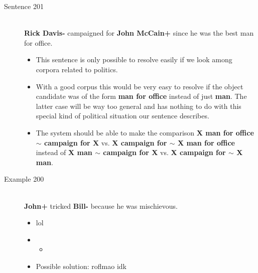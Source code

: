 \documentclass{article}
\newcommand{\insertcode}[2]{\begin{itemize}\item[]\end{itemize}} %
\begin{document}
\begin{description}
  \item[Sentence 201] \hfill \\
  {\bf Rick Davis-} campaigned for {\bf John McCain+} since he was the best man for office.
  \begin{itemize}
  	\item This sentence is only possible to resolve easily if we look among corpora related to politics.
  	\item With a good corpus this would be very easy to resolve if the object candidate was of the form {\bf man for office} instead of just {\bf man}. The latter case will be way too general and has nothing to do with this special kind of political situation our sentence describes.
  	\item The system should be able to make the comparison {\bf X man for office $\sim$ campaign for X} vs. {\bf X campaign for $\sim$ X man for office} instead of {\bf X man $\sim$ campaign for X} vs. {\bf X campaign for $\sim$ X man}. 
  \end{itemize}


  \item[Example 200] \hfill \\
  {\bf John+} tricked {\bf Bill-} because he was mischievous.
  \begin{itemize}
  	\item lol
  	\item \insertcode{"Scripts/example.pl"}{Example}
  	\item Possible solution: roflmao idk
  \end{itemize}

  

\end{description}

\end{document}
